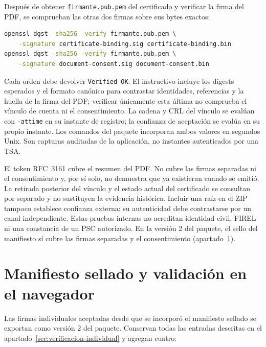 Después de obtener \texttt{firmante.pub.pem} del certificado y verificar la
firma del PDF, se comprueban las otras dos firmas sobre sus bytes exactos:

\begin{lstlisting}[language=bash, numbers=none]
openssl dgst -sha256 -verify firmante.pub.pem \
    -signature certificate-binding.sig certificate-binding.bin
openssl dgst -sha256 -verify firmante.pub.pem \
    -signature document-consent.sig document-consent.bin
\end{lstlisting}

Cada orden debe devolver \texttt{Verified OK}. El instructivo incluye los
digests esperados y el formato canónico para contrastar identidades, referencias
y la huella de la firma del PDF; verificar únicamente esta última no comprueba
el vínculo de cuenta ni el consentimiento. La cadena y CRL del vínculo se
evalúan con \texttt{-attime} en su instante de registro; la confianza de
aceptación se evalúa en su propio instante. Los comandos del paquete incorporan
ambos valores en segundos Unix. Son capturas auditadas de la aplicación, no
instantes autenticados por una TSA.

El token RFC~3161 cubre el resumen del PDF. No cubre las firmas separadas ni el
consentimiento y, por sí solo, no demuestra que ya existieran cuando se emitió.
La retirada posterior del vínculo y el estado actual del certificado se
consultan por separado y no sustituyen la evidencia histórica. Incluir una
raíz en el ZIP tampoco establece confianza externa: su autenticidad debe
contrastarse por un canal independiente. Estas pruebas internas no acreditan
identidad civil, FIREL ni una constancia de un PSC autorizado. En la versión 2
del paquete, el sello del manifiesto sí cubre las firmas separadas y el
consentimiento (apartado~\ref{sec:verificacion-manifiesto}).

\section{Manifiesto sellado y validación en el navegador}\label{sec:verificacion-manifiesto}

Las firmas individuales aceptadas desde que se incorporó el manifiesto sellado se exportan como versión 2 del paquete. Conservan todas las entradas descritas en el apartado~\ref{sec:verificacion-individual} y agregan cuatro:

